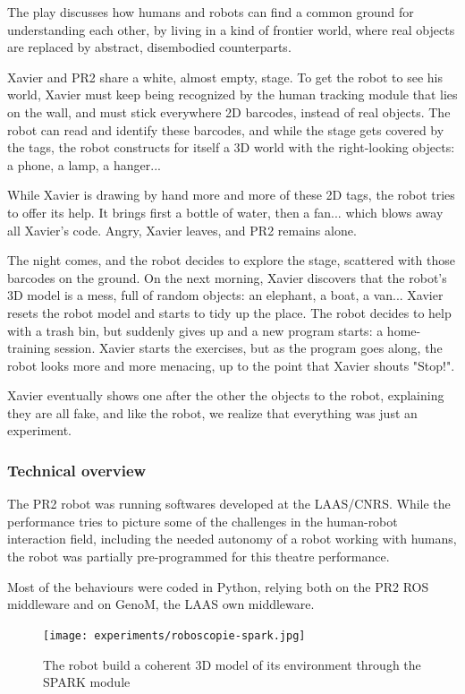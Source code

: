 The play discusses how humans and robots can find a common ground for understanding
each other, by living in a kind of frontier world, where real objects are replaced 
by abstract, disembodied counterparts.

Xavier and PR2 share a white, almost empty, stage. To get the robot to see his
world, Xavier must keep being recognized by the human tracking module that lies
on the wall, and must stick everywhere 2D barcodes, instead of real
objects. The robot can read and identify these barcodes, and while the stage
gets covered by the tags, the robot constructs for itself a 3D world with the
right-looking objects: a phone, a lamp, a hanger...

While Xavier is drawing by hand more and more of these 2D tags, the robot tries
to offer its help. It brings first a bottle of water, then a fan... which blows
away all Xavier's code. Angry, Xavier leaves, and PR2 remains alone.

The night comes, and the robot decides to explore the stage, scattered with
those barcodes on the ground. On the next morning, Xavier discovers that the
robot's 3D model is a mess, full of random objects: an elephant, a boat, a
van... Xavier resets the robot model and starts to tidy up the place. The robot
decides to help with a trash bin, but suddenly gives up and a new program
starts: a home-training session. Xavier starts the exercises, but as the
program goes along, the robot looks more and more menacing, up to the point
that Xavier shouts "Stop!".

Xavier eventually shows one after the other the objects to the robot,
explaining they are all fake, and like the robot, we realize that everything
was just an experiment.

\subsubsection{Technical overview}

The PR2 robot was running softwares developed at the LAAS/CNRS. While the
performance tries to picture some of the challenges in the human-robot
interaction field, including the needed autonomy of a robot working with
humans, the robot was partially pre-programmed for this theatre performance.

Most of the behaviours were coded in Python, relying both on the PR2 ROS
middleware and on {\sc GenoM}, the LAAS own middleware.

\begin{figure}
    \centering
    \texttt{[image: experiments/roboscopie-spark.jpg]}
    \caption{The robot build a coherent 3D model of its environment through the
    SPARK module}
    \label{fig|spark}
\end{figure}


